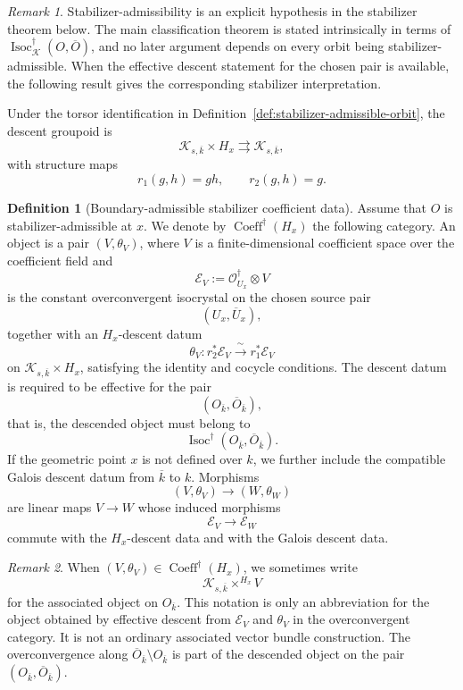 \documentclass[11pt]{amsart}
\theoremstyle{plain}
\theoremstyle{definition}
\newtheorem{definition}{Definition}[section]
\theoremstyle{remark}
\newtheorem{remark}{Remark}[section]
\newcommand{\Isoc}{\operatorname{Isoc}}
\newcommand{\Coeff}{\operatorname{Coeff}}
\begin{document}
\begin{remark}
\label{rem:admissibility-is-hypothesis}
Stabilizer-admissibility is an explicit hypothesis in the stabilizer theorem
below.  The main classification theorem is stated intrinsically in terms of
\(\Isoc^\dagger_{\mathcal K}(O,\overline O)\), and no later argument depends on
every orbit being stabilizer-admissible.  When the effective descent statement
for the chosen pair is available, the following result gives the corresponding
stabilizer interpretation.
\end{remark}

Under the torsor identification in
Definition~\ref{def:stabilizer-admissible-orbit}, the descent groupoid is
\[
  \mathcal K_{s,\overline{k}}\times H_x
  \rightrightarrows
  \mathcal K_{s,\overline{k}},
\]
with structure maps
\[
  r_1(g,h)=g h,
  \qquad
  r_2(g,h)=g.
\]

\begin{definition}[Boundary-admissible stabilizer coefficient data]
\label{def:stabilizer-coefficients}
Assume that \(O\) is stabilizer-admissible at \(x\).  We denote by
\(\Coeff^\dagger(H_x)\) the following category.  An object is a pair
\((V,\theta_V)\), where \(V\) is a finite-dimensional coefficient space over
the coefficient field and
\[
  \mathcal E_V:=
  \mathcal O^\dagger_{U_x}\otimes V
\]
is the constant overconvergent isocrystal on the chosen source pair
\[
  (U_x,\overline U_x),
\]
together with an \(H_x\)-descent datum
\[
  \theta_V:
  r_2^*\mathcal E_V
  \xrightarrow{\;\sim\;}
  r_1^*\mathcal E_V
\]
on \(\mathcal K_{s,\overline k}\times H_x\), satisfying the identity and
cocycle conditions.  The descent datum is required to be effective for the pair
\[
  (O_{\overline k},\overline O_{\overline k}),
\]
that is, the descended object must belong to
\[
  \Isoc^\dagger(O_{\overline k},\overline O_{\overline k}).
\]
If the geometric point \(x\) is not defined over \(k\), we further include the
compatible Galois descent datum from \(\overline k\) to \(k\).  Morphisms
\[
  (V,\theta_V)\longrightarrow(W,\theta_W)
\]
are linear maps \(V\to W\) whose induced morphisms
\[
  \mathcal E_V\longrightarrow \mathcal E_W
\]
commute with the \(H_x\)-descent data and with the Galois descent data.
\end{definition}

\begin{remark}
\label{rem:associated-bundle-notation}
When \((V,\theta_V)\in\Coeff^\dagger(H_x)\), we sometimes write
\[
  \mathcal K_{s,\overline k}\times^{H_x}V
\]
for the associated object on \(O_{\overline k}\).  This notation is only an
abbreviation for the object obtained by effective descent from
\(\mathcal E_V\) and \(\theta_V\) in the overconvergent category.  It is not an
ordinary associated vector bundle construction.  The overconvergence along
\(\overline O_{\overline k}\setminus O_{\overline k}\) is part of the descended
object on the pair \((O_{\overline k},\overline O_{\overline k})\).
\end{remark}
\end{document}
